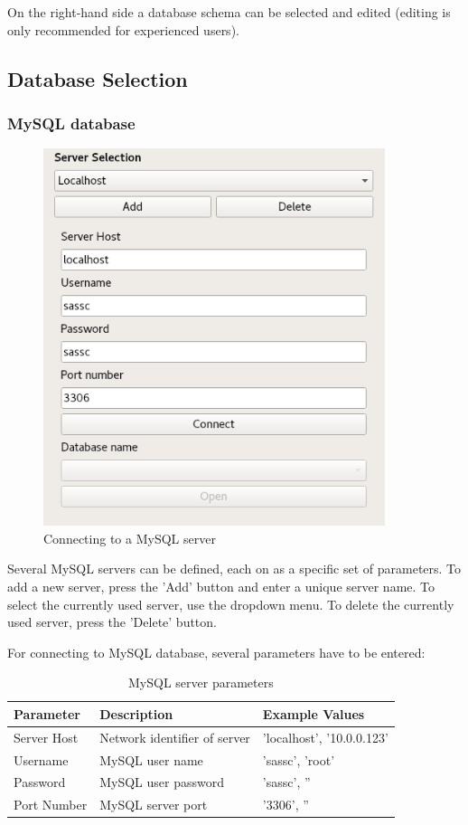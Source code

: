 \documentclass[10pt,letterpaper,extrafontsizes]{memoir}
\begin{document}
On the right-hand side a database schema can be selected and edited (editing is only recommended for experienced users).

\subsection{Database Selection}
\subsubsection{MySQL database}

\begin{figure}[H]
  \center
    \includegraphics[width=10cm]{../screenshots/mysql_server_selection.png}
  \caption{Connecting to a MySQL server}
  \label{fig:mysql_connect}
\end{figure}

Several MySQL servers can be defined, each on as a specific set of parameters. To add a new server, press the 'Add' button and enter a unique server name. To select the currently used server, use the dropdown menu. To delete the currently used server, press the 'Delete' button.

For connecting to MySQL database, several parameters have to be entered:

\begin{table}[h]
  \center
  \begin{tabular}{ | l | l | l |}
    \hline
    \textbf{Parameter} & \textbf{Description} & \textbf{Example Values} \\ \hline
    Server Host & Network identifier of server & 'localhost', '10.0.0.123' \\ \hline
    Username & MySQL user name & 'sassc', 'root' \\ \hline
    Password & MySQL user password & 'sassc', '' \\ \hline
    Port Number & MySQL server port & '3306', '' \\
    \hline
  \end{tabular}
  \caption{MySQL server parameters}
\end{table}
\end{document}
